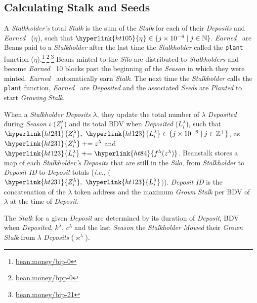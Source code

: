 \documentclass[tikz]{article}
\newcommand{\code}[1]{\texttt{#1}}
\newcommand{\term}[1]{\textsl{#1}}
\newcommand{\Bean}{} %
\newcommand{\bean}{} %
\begin{document}
\vspace*{-1mm}
\subsection{Calculating Stalk and Seeds}
\vspace*{-1mm}
A \term{Stalkholder's} total \term{Stalk} is the sum of the \term{Stalk} for each of their \term{Deposits} and \term{Earned} \Bean\ (\hyperlink{ht105}{$\eta^{\bean}$}), such that $\hyperlink{ht105}{\eta^{\bean}} \in \{j \times 10^{-6} \mid j \in \mathbb{N} \}$. 
\term{Earned} \Bean\ are Beans paid to a \term{Stalkholder} after the last time the \term{Stalkholder} called the \code{plant} function (\hyperlink{ht104}{$\eta$}).\footnote{\href{https://bean.money/bip-0}{bean.money/bip-0}}$^{,}$\footnote{\href{https://bean.money/bpp-0}{bean.money/bpp-0}}$^{,}$\footnote{\href{https://bean.money/bip-21}{bean.money/bip-21}} Beans minted to the \term{Silo} are distributed to \term{Stalkholders} and become \term{Earned} \Bean\ 10 blocks past the beginning of the \term{Season} in which they were minted. \term{Earned} \Bean\ automatically earn \term{Stalk}. The next time the \term{Stalkholder} calls the \code{plant} function, \term{Earned} \Bean\ are \term{Deposited} and the associated \term{Seeds} are \term{Planted} to start \term{Growing} \term{Stalk}.

When a \term{Stalkholder} \term{Deposits} \hyperlink{ht126}{$\lambda$}, they update the total number of \hyperlink{ht126}{$\lambda$} \term{Deposited} during \term{Season} $i$ (\hyperlink{ht231}{$Z_i^{\lambda}$}) and its total BDV when \term{Deposited} (\hyperlink{ht123}{$L_i^{\lambda}$}), such that $\hyperlink{ht231}{Z_i^{\lambda}},\ \hyperlink{ht123}{L_i^{\lambda}} \in \{j \times 10^{-6} \mid j \in \mathbb{Z}^{+} \}$, as $\hyperlink{ht231}{Z_i^{\lambda}} \mathrel{+}= z^{\lambda}$ and $\hyperlink{ht123}{L_i^{\lambda}} \mathrel{+}= \hyperlink{ht84}{f^{\lambda}(z^{\lambda})}$. Beanstalk stores a map of each \term{Stalkholder's} \term{Deposits} that are still in the \term{Silo}, from \term{Stalkholder} to \term{Deposit ID} to \term{Deposit} totals (\term{i.e.}, ($\hyperlink{ht231}{Z_i^{\lambda}},\ \hyperlink{ht123}{L_i^{\lambda}}$)). \term{Deposit ID} is the concatenation of the \hyperlink{ht126}{$\lambda$} token address and the maximum \term{Grown} \term{Stalk} per BDV of \hyperlink{ht126}{$\lambda$} at the time of \term{Deposit}.

The \term{Stalk} for a given \term{Deposit} are determined by its duration of \term{Deposit}, BDV when \term{Deposited}, \hyperlink{ht120}{$k^{\lambda}$}, \hyperlink{ht32}{$c^{\lambda}$} and the last \term{Season} the \term{Stalkholder} \term{Mowed} their \term{Grown} \term{Stalk} from \hyperlink{ht126}{$\lambda$} \term{Deposits} (\hyperlink{ht122}{$\varkappa^{\lambda}$}).
\end{document}
